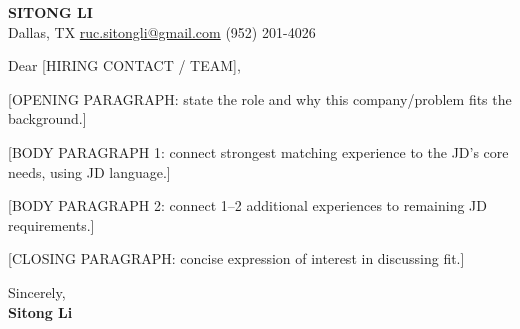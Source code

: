 \documentclass[12pt]{article}
\begin{document}
\begin{center}
  {\LARGE\textbf{\textcolor{accent}{SITONG LI}}} \\[4pt]
  \small Dallas, TX
  \;\textbullet\;
  \href{mailto:ruc.sitongli@gmail.com}{ruc.sitongli@gmail.com}
  \;\textbullet\;
  (952) 201-4026
\end{center}

\vspace{1em}

\noindent [DATE]

\vspace{1em}

\noindent Dear [HIRING CONTACT / TEAM],

\vspace{1em}

[OPENING PARAGRAPH: state the role and why this company/problem fits the background.]

[BODY PARAGRAPH 1: connect strongest matching experience to the JD's core needs, using JD language.]

[BODY PARAGRAPH 2: connect 1--2 additional experiences to remaining JD requirements.]

[CLOSING PARAGRAPH: concise expression of interest in discussing fit.]

\vspace{1em}

\noindent Sincerely,\\[0.5em]
\textbf{Sitong Li}
\end{document}
